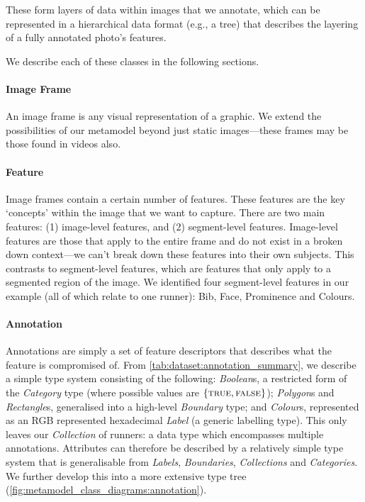 These form layers of data within images that we annotate, which can be represented in a hierarchical data format (e.g., a tree) that describes the layering of a fully annotated photo's features.

We describe each of these classes in the following sections.

\paragraph{Image Frame}

An image frame is any visual representation of a graphic. We extend the possibilities of our metamodel beyond just static images---these frames may be those found in videos also.

\paragraph{Feature}

Image frames contain a certain number of features. These features are the key `concepts' within the image that we want to capture. There are two main features: (1) image-level features, and (2) segment-level features. Image-level features are those that apply to the entire frame and do not exist in a broken down context---we can't break down these features into their own subjects. This contrasts to segment-level features, which are features that only apply to a segmented region of the image. We identified four segment-level features in our example (all of which relate to one runner): Bib, Face, Prominence and Colours.

\paragraph{Annotation}

Annotations are simply a set of feature descriptors that describes what the feature is compromised of. From \cref{tab:dataset:annotation_summary}, we describe a simple type system consisting of the following: \textit{Boolean}s, a restricted form of the \textit{Category} type (where possible values are $\{ \textsc{true}, \textsc{false} \}$); \textit{Polygon}s and \textit{Rectangle}s, generalised into a high-level \textit{Boundary} type; and \textit{Colour}s, represented as an RGB represented hexadecimal \textit{Label} (a generic labelling type). This only leaves our \textit{Collection} of runners: a data type which encompasses multiple annotations. Attributes can therefore be described by a relatively simple type system that is generalisable from \textit{Labels}, \textit{Boundaries}, \textit{Collections} and \textit{Categories}. We further develop this into a more extensive type tree (\cref{fig:metamodel_class_diagrams:annotation}).

